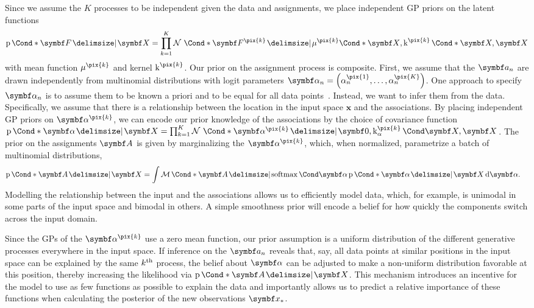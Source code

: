 Since we assume the $K$ processes to be independent given the data and assignments, we place independent GP priors on the latent functions
\begin{align}
    \begin{split}
        \Prob*{\mat{F} \given \mat{X}} = \prod_{k=1}^K \Gaussian*{\mat{F}^{\pix{k}} \given \Fun*{\mu^{\pix{k}}}{\mat{X}}, \Fun*{\K^{\pix{k}}}{\mat{X}, \mat{X}}}
    \end{split}
\end{align}
with mean function $\mu^{\pix{k}}$ and kernel $\K^{\pix{k}}$.
Our prior on the assignment process is composite.
First, we assume that the $\mat{a}_n$ are drawn independently from multinomial distributions with logit parameters $\mat{\alpha}_n = \left( \alpha_n^{\pix{1}}, \ldots, \alpha_n^{\pix{K}} \right)$.
One approach to specify $\mat{\alpha}_n$ is to assume them to be known a priori and to be equal for all data points~\parencite{lazaro-gredilla_overlapping_2012}.
Instead, we want to infer them from the data.
Specifically, we assume that there is a relationship between the location in the input space $\mathbf{x}$ and the associations.
By placing independent GP priors on $\mat{\alpha}^{\pix{k}}$, we can encode our prior knowledge of the associations by the choice of covariance function
$\Prob*{\mat{\alpha} \given \mat{X}} = \prod_{k=1}^K \Gaussian*{\rv{\alpha}^{\pix{k}} \given \mat{0}, \Fun{\K_\alpha^{\pix{k}}}{\mat{X}, \mat{X}}}$.
The prior on the assignments $\mat{A}$ is given by marginalizing the $\mat{\alpha}^{\pix{k}}$, which, when normalized, parametrize a batch of multinomial distributions,
\begin{align}
    \begin{split}
        \label{eq:data_association:multinomial_likelihood}
        \Prob*{\mat{A} \given \mat{X}} &=
        \int
        \Multinomial*{\mat{A} \given \Fun{\softmax}{\mat{\alpha}}} \Prob*{\mat{\alpha} \given \mat{X}}
        \diff \rv{\alpha}.
    \end{split}
\end{align}
Modelling the relationship between the input and the associations allows us to efficiently model data, which, for example, is unimodal in some parts of the input space and bimodal in others.
A simple smoothness prior will encode a belief for how quickly the components switch across the input domain.

Since the GPs of the $\mat{\alpha}^{\pix{k}}$ use a zero mean function, our prior assumption is a uniform distribution of the different generative processes everywhere in the input space.
If inference on the $\mat{a}_n$ reveals that, say, all data points at similar positions in the input space can be explained by the same $k^{\text{th}}$ process, the belief about $\mat{\alpha}$ can be adjusted to make a non-uniform distribution favorable at this position, thereby increasing the likelihood via $\Prob*{\mat{A} \given \mat{X}}$.
This mechanism introduces an incentive for the model to use as few functions as possible to explain the data and importantly allows us to predict a relative importance of these functions when calculating the posterior of the new observations $\mat{x}_\ast$.

